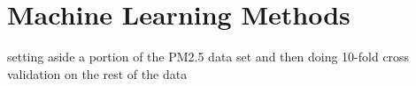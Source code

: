 \section{Machine Learning Methods}

setting aside a portion of the PM2.5 data set and then doing 10-fold cross validation on the rest of the data